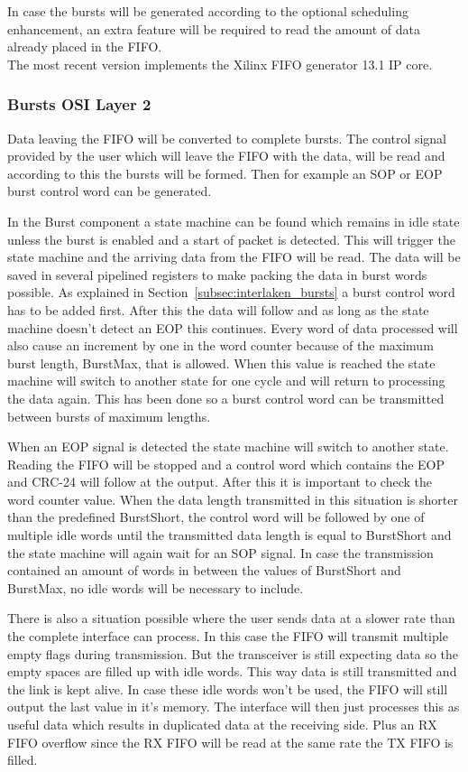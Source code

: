 		In case the bursts will be generated according to the optional scheduling enhancement, an extra feature will be required to read the amount of data already placed in the FIFO.\\
		
		The most recent version implements the Xilinx FIFO generator 13.1 IP core.
		
	\subsubsection[Bursts]{Bursts \hfill OSI Layer 2}
		Data leaving the FIFO will be converted to complete bursts. The control signal provided by the user which will leave the FIFO with the data, will be read and according to this the bursts will be formed. Then for example an SOP or EOP burst control word can be generated.
		
		In the Burst component a state machine can be found which remains in idle state unless the burst is enabled and a start of packet is detected. This will trigger the state machine and the arriving data from the FIFO will be read. The data will be saved in several pipelined registers to make packing the data in burst words possible. As explained in Section~\ref{subsec:interlaken_bursts} a burst control word has to be added first. After this the data will follow and as long as the state machine doesn't detect an EOP this continues. Every word of data processed will also cause an increment by one in the word counter because of the maximum burst length, BurstMax, that is allowed. When this value is reached the state machine will switch to another state for one cycle and will return to processing the data again. This has been done so a burst control word can be transmitted between bursts of maximum lengths.
		
		When an EOP signal is detected the state machine will switch to another state. Reading the FIFO will be stopped and a control word which contains the EOP and CRC-24 will follow at the output. After this it is important to check the word counter value. When the data length transmitted in this situation is shorter than the predefined BurstShort, the control word will be followed by one of multiple idle words until the transmitted data length is equal to BurstShort and the state machine will again wait for an SOP signal. In case the transmission contained an amount of words in between the values of BurstShort and BurstMax, no idle words will be necessary to include. 
		
		There is also a situation possible where the user sends data at a slower rate than the complete interface can process. In this case the FIFO will transmit multiple empty flags during transmission. But the transceiver is still expecting data so the empty spaces are filled up with idle words. This way data is still transmitted and the link is kept alive. In case these idle words won't be used, the FIFO will still output the last value in it's memory. The interface will then just processes this as useful data which results in duplicated data at the receiving side. Plus an RX FIFO overflow since the RX FIFO will be read at the same rate the TX FIFO is filled.\\
		
